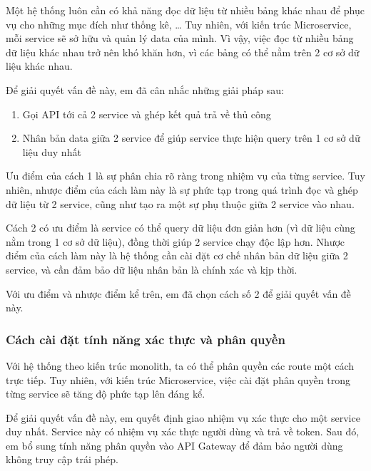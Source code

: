 \documentclass[./../main.tex]{subfiles}
\begin{document}
Một hệ thống luôn cần có khả năng đọc dữ liệu từ nhiều bảng khác nhau để
phục vụ cho những mục đích như thống kê, \ldots{} Tuy nhiên, với kiến
trúc Microservice, mỗi service sẽ sở hữu và quản lý data của mình. Vì
vậy, việc đọc từ nhiều bảng dữ liệu khác nhau trở nên khó khăn hơn, vì
các bảng có thể nằm trên 2 cơ sở dữ liệu khác nhau.

Để giải quyết vấn đề này, em đã cân nhắc những giải pháp sau:

\begin{enumerate}
\def\labelenumi{\arabic{enumi}.}
\item
  
  Gọi API tới cả 2 service và ghép kết quả trả về thủ công
  
\item
  
  Nhân bản data giữa 2 service để giúp service thực hiện query trên 1 cơ
  sở dữ liệu duy nhất
  
\end{enumerate}

Ưu điểm của cách 1 là sự phân chia rõ ràng trong nhiệm vụ của từng
service. Tuy nhiên, nhược điểm của cách làm này là sự phức tạp trong quá
trình đọc và ghép dữ liệu từ 2 service, cũng như tạo ra một sự phụ thuộc
giữa 2 service vào nhau.

Cách 2 có ưu điểm là service có thể query dữ liệu đơn giản hơn (vì dữ
liệu cùng nằm trong 1 cơ sở dữ liệu), đồng thời giúp 2 service chạy độc
lập hơn. Nhược điểm của cách làm này là hệ thống cần cài đặt cơ chế nhân
bản dữ liệu giữa 2 service, và cần đảm bảo dữ liệu nhân bản là chính xác
và kịp thời.

Với ưu điểm và nhược điểm kể trên, em đã chọn cách số 2 để giải quyết
vấn đề này.

\hypertarget{cuxe1ch-cuxe0i-ux111ux1eb7t-tuxednh-nux103ng-xuxe1c-thux1ef1c-vuxe0-phuxe2n-quyux1ec1n}{%
\subsubsection{Cách cài đặt tính năng xác thực và phân
quyền}\label{cuxe1ch-cuxe0i-ux111ux1eb7t-tuxednh-nux103ng-xuxe1c-thux1ef1c-vuxe0-phuxe2n-quyux1ec1n}}

Với hệ thống theo kiến trúc monolith, ta có thể phân quyền các route một
cách trực tiếp. Tuy nhiên, với kiến trúc Microservice, việc cài đặt phân
quyền trong từng service sẽ tăng độ phức tạp lên đáng kể.

Để giải quyết vấn đề này, em quyết định giao nhiệm vụ xác thực cho một
service duy nhất. Service này có nhiệm vụ xác thực người dùng và trả về
token. Sau đó, em bổ sung tính năng phân quyền vào API Gateway để đảm
bảo người dùng không truy cập trái phép.
\end{document}
